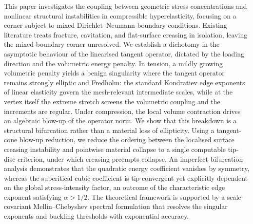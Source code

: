 This paper investigates the coupling between geometric stress concentrations and nonlinear structural instabilities in
compressible hyperelasticity, focusing on a corner subject to mixed Dirichlet--Neumann boundary conditions. Existing
literature treats fracture, cavitation, and flat-surface creasing in isolation, leaving the mixed-boundary corner
unresolved. We establish a dichotomy in the asymptotic behaviour of the linearised tangent operator, dictated by the
loading direction and the volumetric energy penalty. In tension, a mildly growing volumetric penalty yields a benign
singularity where the tangent operator remains strongly elliptic and Fredholm: the standard Kondratiev edge exponents
of linear elasticity govern the mesh-relevant intermediate scales, while at the vertex itself the extreme stretch
screens the volumetric coupling and the increments are regular. Under compression, the local volume contraction
drives an algebraic blow-up of the operator norm. We show
that this breakdown is a structural bifurcation rather than a material loss of ellipticity. Using a tangent-cone
blow-up reduction, we reduce the ordering between the localised surface creasing instability and pointwise material
collapse to a single computable tip-disc criterion, under which creasing preempts collapse. An
imperfect bifurcation analysis demonstrates that the quadratic energy coefficient vanishes by symmetry, whereas the
subcritical cubic coefficient is tip-convergent yet explicitly dependent on the global stress-intensity factor, an
outcome of the characteristic edge exponent satisfying $\alpha > 1/2$. The theoretical framework is supported by a
scale-covariant Mellin--Chebyshev spectral formulation that resolves the singular exponents and buckling thresholds
with exponential accuracy.